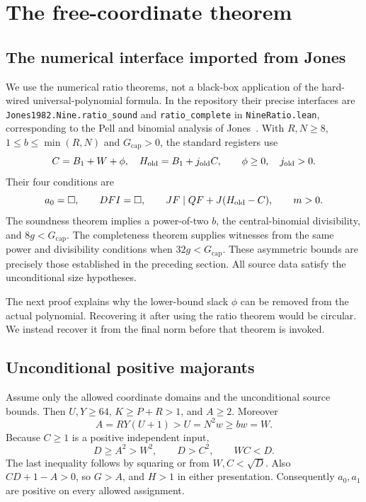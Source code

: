\documentclass[11pt]{article}
\newcommand{\Gcap}{G_{\mathrm{cap}}}
\theoremstyle{remark}\newtheorem{remark}[theorem]{Remark}
\begin{document}
\section{The free-coordinate theorem}\label{sec:freeC}

\subsection{The numerical interface imported from Jones}

We use the numerical ratio theorems, not a black-box application of the
hard-wired universal-polynomial formula. In the repository their precise
interfaces are \texttt{Jones1982.Nine.ratio\_sound} and
\texttt{ratio\_complete} in \texttt{NineRatio.lean}, corresponding to the
Pell and binomial analysis of Jones~\cite{Jones1982}. With
$R,N\geq8$, $1\leq b\leq\min(R,N)$ and $\Gcap>0$, the standard registers
use
\[
 C=B_1+W+\phi,\quad H_{\rm old}=B_1+j_{\rm old}C,
 \qquad\phi\geq0,\quad j_{\rm old}>0.
\]
Their four conditions are
\begin{equation}\label{eq:ratio-conditions}
 a_0=\square,\qquad DFI=\square,\qquad
 JF\mid QF+J(H_{\rm old}-C),\qquad m>0.
\end{equation}
The soundness theorem implies a power-of-two $b$, the central-binomial
divisibility, and $8g<\Gcap$. The completeness theorem supplies witnesses
from the same power and divisibility conditions when $32g<\Gcap$.
These asymmetric bounds are precisely those established in the preceding
section. All source data satisfy the unconditional size hypotheses.

The next proof explains why the lower-bound slack $\phi$ can be removed
from the actual polynomial. Recovering it after using the ratio theorem
would be circular. We instead recover it from the final norm before that
theorem is invoked.

\subsection{Unconditional positive majorants}

Assume only the allowed coordinate domains and the unconditional source
bounds. Then $U,Y\geq64$, $K\geq P+R>1$, and $A\geq2$. Moreover
\[
 A=RY(U+1)>U=N^2w\geq bw=W.
\]
Because $C\geq1$ is a positive independent input,
\[
 D\geq A^2>W^2,\qquad D>C^2,\qquad WC<D.
\]
The last inequality follows by squaring or from $W,C<\sqrt D$.
Also $CD+1-A>0$, so $G>A$, and $H>1$ in either presentation.
Consequently $a_0,a_1$ are positive on every allowed assignment.
\end{document}
